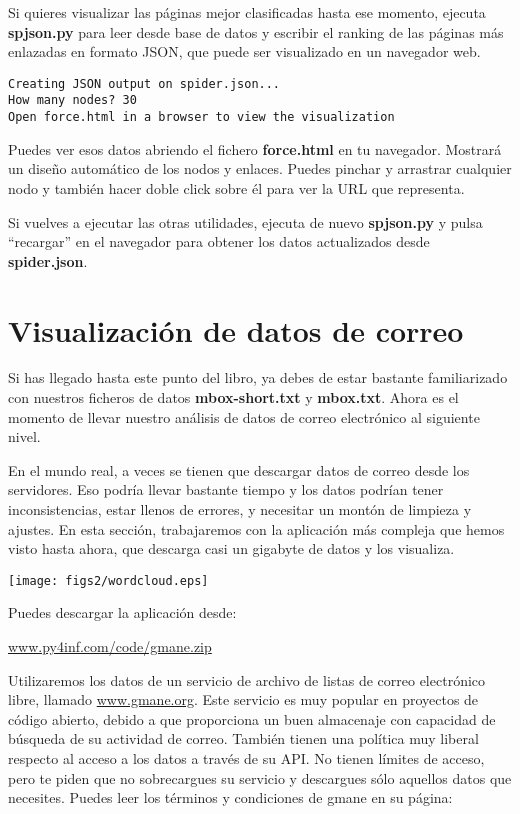 Si quieres visualizar las páginas mejor clasificadas hasta ese momento,
ejecuta {\bf spjson.py} para leer desde base de datos y escribir el ranking de
las páginas más enlazadas en formato JSON, que puede ser visualizado en
un navegador web.

\beforeverb
\begin{verbatim}
Creating JSON output on spider.json...
How many nodes? 30
Open force.html in a browser to view the visualization
\end{verbatim}
\afterverb
%
Puedes ver esos datos abriendo el fichero {\bf force.html} en tu navegador.
Mostrará un diseño automático de los nodos y enlaces. Puedes pinchar y
arrastrar cualquier nodo y también hacer doble click sobre él para ver la URL
que representa.

Si vuelves a ejecutar las otras utilidades, ejecuta de nuevo {\bf spjson.py} y
pulsa ``recargar'' en el navegador para obtener los datos actualizados desde {\bf spider.json}.

\section{Visualización de datos de correo}

Si has llegado hasta este punto del libro, ya debes de estar bastante familiarizado con
nuestros ficheros de datos {\bf mbox-short.txt} y {\bf mbox.txt}. Ahora es el momento
de llevar nuestro análisis de datos de correo electrónico al siguiente nivel.

En el mundo real, a veces se tienen que descargar datos de correo desde los servidores.
Eso podría llevar bastante tiempo y los datos podrían tener inconsistencias,
estar llenos de errores, y necesitar un montón de limpieza y ajustes. En esta sección,
trabajaremos con la aplicación más compleja que hemos visto hasta ahora, que
descarga casi un gigabyte de datos y los visualiza.

\beforefig
\centerline{\texttt{[image: figs2/wordcloud.eps]}}
\afterfig

Puedes descargar la aplicación desde:

\url{www.py4inf.com/code/gmane.zip}

Utilizaremos los datos de un servicio de archivo de listas de correo electrónico libre,
llamado \url{www.gmane.org}. Este servicio es muy popular en proyectos de código abierto,
debido a que proporciona un buen almacenaje con capacidad de búsqueda de su
actividad de correo. También tienen una política muy liberal respecto al acceso a
los datos a través de su API. No tienen límites de acceso, pero te piden que no
sobrecargues su servicio y descargues sólo aquellos datos que necesites. Puedes leer
los términos y condiciones de gmane en su página:

